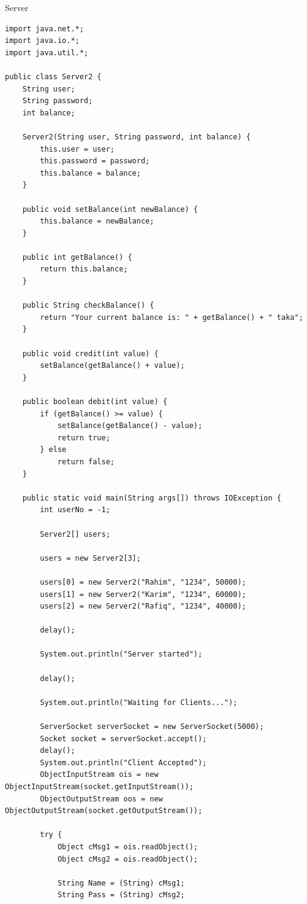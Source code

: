 \documentclass[11pt]{article}
\begin{document}
\newpage
Server
\begin{lstlisting}
import java.net.*;
import java.io.*;
import java.util.*;

public class Server2 {
    String user;
    String password;
    int balance;

    Server2(String user, String password, int balance) {
        this.user = user;
        this.password = password;
        this.balance = balance;
    }

    public void setBalance(int newBalance) {
        this.balance = newBalance;
    }

    public int getBalance() {
        return this.balance;
    }

    public String checkBalance() {
        return "Your current balance is: " + getBalance() + " taka";
    }

    public void credit(int value) {
        setBalance(getBalance() + value);
    }

    public boolean debit(int value) {
        if (getBalance() >= value) {
            setBalance(getBalance() - value);
            return true;
        } else
            return false;
    }

    public static void main(String args[]) throws IOException {
        int userNo = -1;

        Server2[] users;

        users = new Server2[3];

        users[0] = new Server2("Rahim", "1234", 50000);
        users[1] = new Server2("Karim", "1234", 60000);
        users[2] = new Server2("Rafiq", "1234", 40000);

        delay();

        System.out.println("Server started");

        delay();

        System.out.println("Waiting for Clients...");

        ServerSocket serverSocket = new ServerSocket(5000);
        Socket socket = serverSocket.accept();
        delay();
        System.out.println("Client Accepted");
        ObjectInputStream ois = new ObjectInputStream(socket.getInputStream());
        ObjectOutputStream oos = new ObjectOutputStream(socket.getOutputStream());

        try {
            Object cMsg1 = ois.readObject();
            Object cMsg2 = ois.readObject();

            String Name = (String) cMsg1;
            String Pass = (String) cMsg2;


\end{lstlisting}
\end{document}
